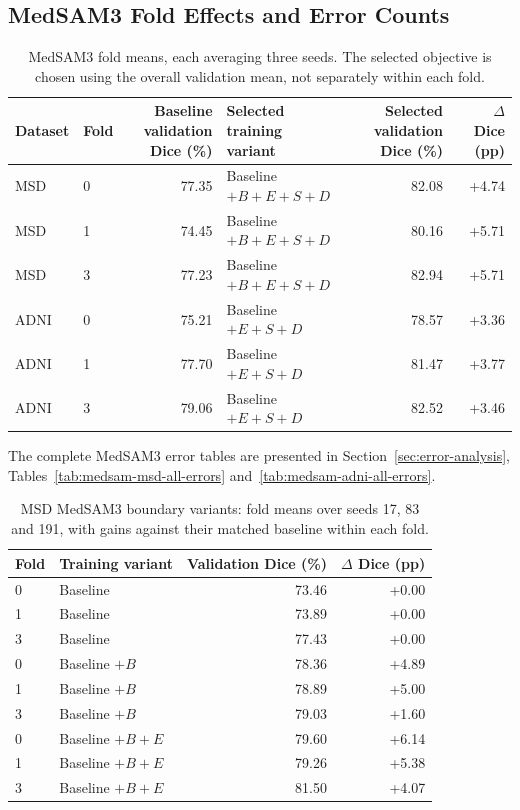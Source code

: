 \documentclass[12pt,a4paper]{article}
\begin{document}
\clearpage

\subsection{MedSAM3 Fold Effects and Error Counts}
\begin{table}[htbp]
\centering\small{}
\setlength{\tabcolsep}{5pt}
\renewcommand{\arraystretch}{1.15}
\begin{tabular}{@{}llrlrr@{}}
\hline
Dataset & Fold & \shortstack{Baseline validation\\Dice (\%)} & \shortstack{Selected training\\variant} & \shortstack{Selected validation\\Dice (\%)} & \shortstack{$\Delta$ Dice\\(pp)} \\
\hline
MSD & 0 & 77.35 & Baseline $+B+E+S+D$ & 82.08 & +4.74 \\
MSD & 1 & 74.45 & Baseline $+B+E+S+D$ & 80.16 & +5.71 \\
MSD & 3 & 77.23 & Baseline $+B+E+S+D$ & 82.94 & +5.71 \\
ADNI & 0 & 75.21 & Baseline $+E+S+D$ & 78.57 & +3.36 \\
ADNI & 1 & 77.70 & Baseline $+E+S+D$ & 81.47 & +3.77 \\
ADNI & 3 & 79.06 & Baseline $+E+S+D$ & 82.52 & +3.46 \\
\hline
\end{tabular}
\caption{MedSAM3 fold means, each averaging three seeds. The selected objective is chosen using the overall validation mean, not separately within each fold.}
\label{tab:medsam-noaug-folds}
\end{table}
The complete MedSAM3 error tables are presented in
Section~\ref{sec:error-analysis}, Tables~\ref{tab:medsam-msd-all-errors}
and~\ref{tab:medsam-adni-all-errors}.

\begin{table}[htbp]
\centering\small{}
\setlength{\tabcolsep}{5pt}
\renewcommand{\arraystretch}{1.15}
\begin{tabular}{@{}llrr@{}}
\hline
Fold & Training variant & Validation Dice (\%) & $\Delta$ Dice (pp) \\
\hline
0 & Baseline & 73.46 & +0.00 \\
1 & Baseline & 73.89 & +0.00 \\
3 & Baseline & 77.43 & +0.00 \\
0 & Baseline $+B$ & 78.36 & +4.89 \\
1 & Baseline $+B$ & 78.89 & +5.00 \\
3 & Baseline $+B$ & 79.03 & +1.60 \\
0 & Baseline $+B+E$ & 79.60 & +6.14 \\
1 & Baseline $+B+E$ & 79.26 & +5.38 \\
3 & Baseline $+B+E$ & 81.50 & +4.07 \\
\hline
\end{tabular}
\caption{MSD MedSAM3 boundary variants: fold means over seeds 17, 83 and 191, with gains against their matched baseline within each fold.}
\label{tab:medsam-msd-original-folds}
\end{table}
\clearpage
\end{document}
